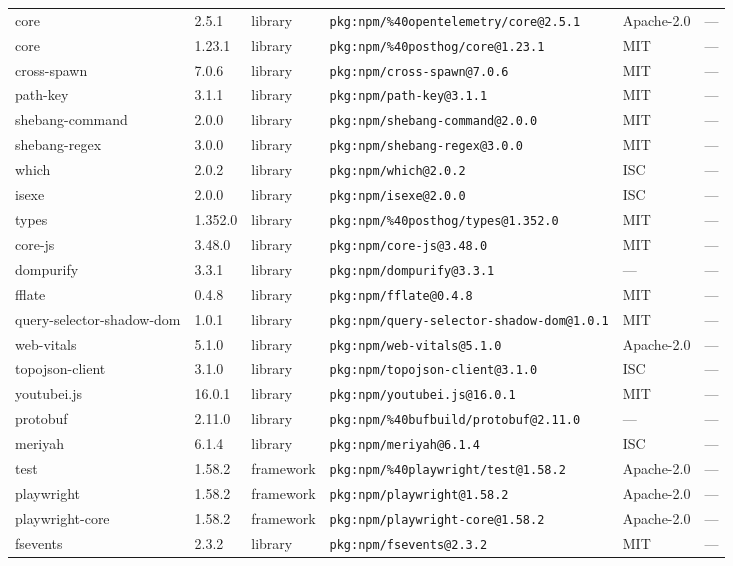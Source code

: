 \documentclass[11pt]{article}
\begin{document}
\begin{longtable}{|l|l|l|p{2.2cm}|l|p{4cm}|}
core & 2.5.1 & library & \texttt{pkg:npm/\%40opentelemetry/core@2.5.1} & Apache-2.0 & — \\
core & 1.23.1 & library & \texttt{pkg:npm/\%40posthog/core@1.23.1} & MIT & — \\
cross-spawn & 7.0.6 & library & \texttt{pkg:npm/cross-spawn@7.0.6} & MIT & — \\
path-key & 3.1.1 & library & \texttt{pkg:npm/path-key@3.1.1} & MIT & — \\
shebang-command & 2.0.0 & library & \texttt{pkg:npm/shebang-command@2.0.0} & MIT & — \\
shebang-regex & 3.0.0 & library & \texttt{pkg:npm/shebang-regex@3.0.0} & MIT & — \\
which & 2.0.2 & library & \texttt{pkg:npm/which@2.0.2} & ISC & — \\
isexe & 2.0.0 & library & \texttt{pkg:npm/isexe@2.0.0} & ISC & — \\
types & 1.352.0 & library & \texttt{pkg:npm/\%40posthog/types@1.352.0} & MIT & — \\
core-js & 3.48.0 & library & \texttt{pkg:npm/core-js@3.48.0} & MIT & — \\
dompurify & 3.3.1 & library & \texttt{pkg:npm/dompurify@3.3.1} & — & — \\
fflate & 0.4.8 & library & \texttt{pkg:npm/fflate@0.4.8} & MIT & — \\
query-selector-shadow-dom & 1.0.1 & library & \texttt{pkg:npm/query-selector-shadow-dom@1.0.1} & MIT & — \\
web-vitals & 5.1.0 & library & \texttt{pkg:npm/web-vitals@5.1.0} & Apache-2.0 & — \\
topojson-client & 3.1.0 & library & \texttt{pkg:npm/topojson-client@3.1.0} & ISC & — \\
youtubei.js & 16.0.1 & library & \texttt{pkg:npm/youtubei.js@16.0.1} & MIT & — \\
protobuf & 2.11.0 & library & \texttt{pkg:npm/\%40bufbuild/protobuf@2.11.0} & — & — \\
meriyah & 6.1.4 & library & \texttt{pkg:npm/meriyah@6.1.4} & ISC & — \\
test & 1.58.2 & framework & \texttt{pkg:npm/\%40playwright/test@1.58.2} & Apache-2.0 & — \\
playwright & 1.58.2 & framework & \texttt{pkg:npm/playwright@1.58.2} & Apache-2.0 & — \\
playwright-core & 1.58.2 & framework & \texttt{pkg:npm/playwright-core@1.58.2} & Apache-2.0 & — \\
fsevents & 2.3.2 & library & \texttt{pkg:npm/fsevents@2.3.2} & MIT & — \\

\end{longtable}
\end{document}
